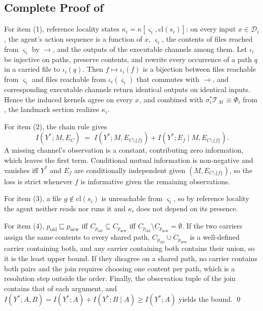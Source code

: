 \documentclass[11pt]{article}
\theoremstyle{definition}
\theoremstyle{plain}
\newcommand{\Dcal}{\mathcal{D}}
\newcommand{\Mcal}{\mathcal{M}}
\newcommand{\Tcal}{\mathcal{T}}
\begin{document}
\subsection{Complete Proof of \texorpdfstring{}{Proposition 3}}
For item (1), reference locality states $\kappa_i = \kappa[\varsigma_i, \mathrm{cl}(s_i)]$: on every input $x \in \Dcal_i$, the agent's action sequence is a function of $x$, $\varsigma_i$, the contents of files reached from $\varsigma_i$ by $\to$, and the outputs of the executable channels among them. Let $\iota_i$ be injective on paths, preserve contents, and rewrite every occurrence of a path $q$ in a carried file to $\iota_i(q)$. Then $f \mapsto \iota_i(f)$ is a bijection between files reachable from $\varsigma_i$ and files reachable from $\iota_i(\varsigma_i)$ that commutes with $\to$, and corresponding executable channels return identical outputs on identical inputs. Hence the induced kernels agree on every $x$, and combined with $\sigma_i^* \Tcal_{\Mcal} \equiv \Phi_i$ from , the landmark section realizes $\kappa_i$.

For item (2), the chain rule gives
\[
  I(Y^*; M, E_{C}) \;=\; I(Y^*; M, E_{C \setminus \{f\}}) + I(Y^*; E_f \mid M, E_{C \setminus \{f\}}).
\]
A missing channel's observation is a constant, contributing zero information, which leaves the first term. Conditional mutual information is non-negative and vanishes iff $Y^*$ and $E_f$ are conditionally independent given $(M, E_{C \setminus \{f\}})$, so the loss is strict whenever $f$ is informative given the remaining observations.

For item (3), a file $g \notin \mathrm{cl}(s_i)$ is unreachable from $\varsigma_i$, so by reference locality the agent neither reads nor runs it and $\kappa_i$ does not depend on its presence.

For item (4), $p_{\mathrm{old}} \sqsubseteq p_{\mathrm{new}}$ iff $C_{p_{\mathrm{old}}} \subseteq C_{p_{\mathrm{new}}}$ iff $C_{p_{\mathrm{old}}} \setminus C_{p_{\mathrm{new}}} = \emptyset$. If the two carriers assign the same contents to every shared path, $C_{p_{\mathrm{old}}} \cup C_{p_{\mathrm{new}}}$ is a well-defined carrier containing both, and any carrier containing both contains their union, so it is the least upper bound. If they disagree on a shared path, no carrier contains both pairs and the join requires choosing one content per path, which is a resolution step outside the order. Finally, the observation tuple of the join contains that of each argument, and $I(Y^*; A, B) = I(Y^*; A) + I(Y^*; B \mid A) \ge I(Y^*; A)$ yields the bound. \qed
\end{document}
